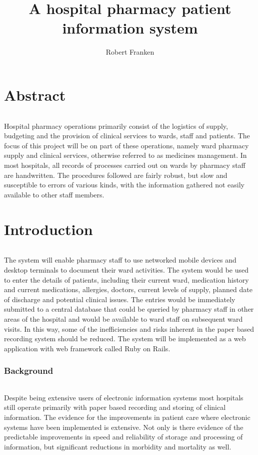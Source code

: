 \documentclass[letterpaper]{amsart}
\author{Robert Franken}
\title{A hospital pharmacy patient information system}
\begin{document}
\maketitle
\part{Abstract}
\paragraph{} Hospital pharmacy operations primarily consist of the logistics of supply, budgeting and the provision of clinical services to wards, staff and patients. 
The focus of this project will be on part of these operations, namely ward pharmacy supply and clinical services, otherwise referred to as medicines management. In most hospitals, all records of processes carried out on wards by pharmacy staff are handwritten. The procedures followed are fairly robust, but slow and susceptible to errors of various kinds, with the information gathered not easily available to other staff members.
\part{Introduction}
\paragraph{}The system will enable pharmacy staff to use networked mobile devices and desktop terminals to document their ward activities. The system would be used to enter the details of patients, including their current ward, medication history and current medications, allergies, doctors, current levels of supply, planned date of discharge and potential clinical issues.  The entries would be immediately submitted to a central database that could be queried by pharmacy staff in other areas of the hospital and would be available to ward staff on subsequent ward visits.  In this way, some of the inefficiencies and risks inherent in the paper based recording system should be reduced.
The system will be implemented as a web application with web framework called Ruby on Rails.
\section{Background}
\paragraph{}Despite being extensive users of electronic information systems most hospitals still operate primarily with paper based recording and storing of clinical information.  The evidence for the improvements in patient care where electronic systems have been implemented is extensive.  Not only is there evidence of the predictable improvements in speed and reliability of storage and processing of information, but significant reductions in morbidity and mortality as well\cite{Amarasingham:2009xy}. 
\end{document}
